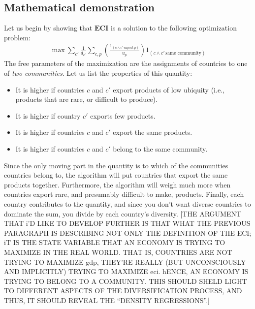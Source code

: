 \documentclass{pnastwo}
\renewcommand{\vec}[1]{\mathbf{#1}}
\begin{document}
\begin{article}
\subsection{Mathematical demonstration}
Let us begin by showing that $\vec{ECI}$ is a solution to the following optimization problem:
\begin{align}
    \max \sum_{c'}\frac{1}{d_{c'}}\sum_{c,p} \left(\frac{1_{(c\wedge c'~\text{export}~p)} }{u_p}\right)1_{(c\wedge c'~\text{same community})}
\label{eq:maxproblem}
\end{align}
The free parameters of the maximization are the assignments of countries to one of \emph{two communities}. Let us list the properties of this quantity:
\begin{itemize}
    \item It is higher if countries $c$ and $c'$ export products of low ubiquity (i.e., products that are rare, or difficult to produce).
    \item It is higher if country $c'$ exports few products.
    \item It is higher if countries $c$ and $c'$ export the same products.
    \item It is higher if countries $c$ and $c'$ belong to the same community.
\end{itemize}
Since the only moving part in the quantity is to which of the communities countries belong to, the algorithm will put countries that export the same products together. Furthermore, the algorithm will weigh much more when countries export rare, and presumably difficult to make, products. Finally, each country contributes to the quantity, and since you don't want diverse countries to dominate the sum, you divide by each country's diversity.
[THE ARGUMENT THAT i'D LIKE TO DEVELOP FURTHER IS THAT WHAT THE PREVIOUS PARAGRAPH IS DESCRIBING NOT ONLY THE DEFINITION OF THE ECI; iT IS THE STATE VARIABLE THAT AN ECONOMY IS TRYING TO MAXIMIZE IN THE REAL WORLD. THAT IS, COUNTRIES ARE NOT TRYING TO MAXIMIZE gdp, THEY'RE REALLY (BUT UNCONSCIOUSLY AND IMPLICITLY) TRYING TO MAXIMIZE eci. hENCE, AN ECONOMY IS TRYING TO BELONG TO A COMMUNITY. THIS SHOULD SHELD LIGHT TO DIFFERENT ASPECTS OF THE DIVERSIFICATION PROCESS, AND THUS, IT SHOULD REVEAL THE ``DENSITY REGRESSIONS''.]


\end{article}
\end{document}
